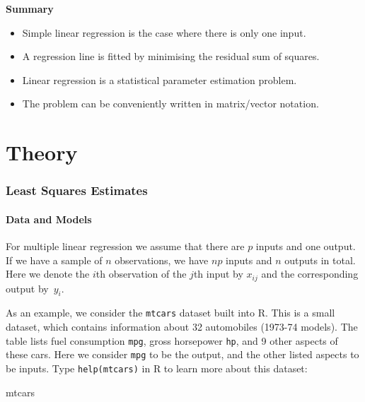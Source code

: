 \documentclass[
  a4paper,
]{article}
\newenvironment{Shaded}{\begin{snugshade}}{\end{snugshade}}
\newcommand{\NormalTok}[1]{#1}
\providecommand{\tightlist}{%
  \setlength{\itemsep}{0pt}\setlength{\parskip}{0pt}}
\theoremstyle{definition}
\theoremstyle{definition}
\theoremstyle{definition}
\theoremstyle{definition}
\theoremstyle{remark}
\begin{document}
\textbf{Summary}

\begin{itemize}
\tightlist
\item
  Simple linear regression is the case where there is only one input.
\item
  A regression line is fitted by minimising the residual sum of squares.
\item
  Linear regression is a statistical parameter estimation problem.
\item
  The problem can be conveniently written in matrix/vector notation.
\end{itemize}

\clearpage

\part{Theory}\label{part-theory}

\clearpage

\section{Least Squares Estimates}\label{S02-multiple}

\subsection{Data and Models}\label{data-and-models}

For multiple linear regression we assume that there are \(p\) inputs and
one output. If we have a sample of \(n\) observations, we have \(np\)
inputs and \(n\) outputs in total. Here we denote the \(i\)th observation
of the \(j\)th input by \(x_{ij}\) and the corresponding output by~\(y_i\).

As an example, we consider the \texttt{mtcars} dataset built into R. This is a small
dataset, which contains information about 32 automobiles (1973-74 models). The
table lists fuel consumption \texttt{mpg}, gross horsepower \texttt{hp}, and 9 other aspects
of these cars. Here we consider \texttt{mpg} to be the output, and the other listed
aspects to be inputs. Type \texttt{help(mtcars)} in R to learn more about this
dataset:

\begin{Shaded}
\begin{Highlighting}[]
\NormalTok{mtcars}
\end{Highlighting}
\end{Shaded}
\end{document}
